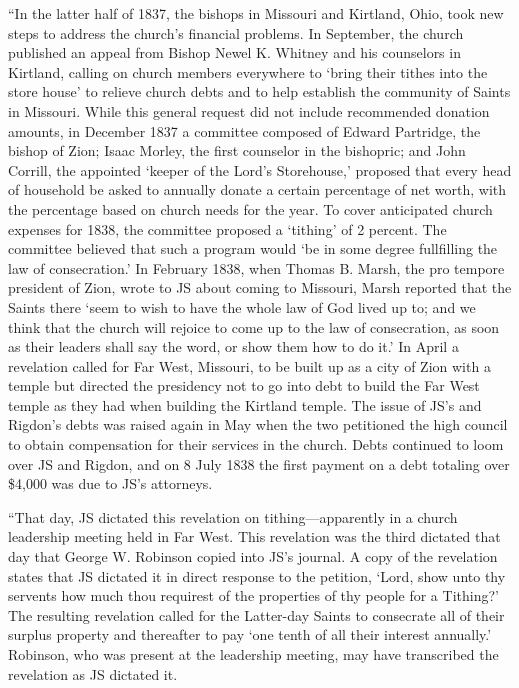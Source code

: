 			``In the latter half of 1837, the bishops in Missouri and Kirtland, Ohio, took new steps to address the church's financial problems. In September, the church published an appeal from Bishop Newel K. Whitney and his counselors in Kirtland, calling on church members everywhere to `bring their tithes into the store house' to relieve church debts and to help establish the community of Saints in Missouri. While this general request did not include recommended donation amounts, in December 1837 a committee composed of Edward Partridge, the bishop of Zion; Isaac Morley, the first counselor in the bishopric; and John Corrill, the appointed `keeper of the Lord's Storehouse,' proposed that every head of household be asked to annually donate a certain percentage of net worth, with the percentage based on church needs for the year. To cover anticipated church expenses for 1838, the committee proposed a `tithing' of 2 percent. The committee believed that such a program would `be in some degree fullfilling the law of consecration.' In February 1838, when Thomas B. Marsh, the pro tempore president of Zion, wrote to JS about coming to Missouri, Marsh reported that the Saints there `seem to wish to have the whole law of God lived up to; and we think that the church will rejoice to come up to the law of consecration, as soon as their leaders shall say the word, or show them how to do it.' In April a revelation called for Far West, Missouri, to be built up as a city of Zion with a temple but directed the presidency not to go into debt to build the Far West temple as they had when building the Kirtland temple. The issue of JS's and Rigdon's debts was raised again in May when the two petitioned the high council to obtain compensation for their services in the church. Debts continued to loom over JS and Rigdon, and on 8 July 1838 the first payment on a debt totaling over \$4,000 was due to JS's attorneys.
			
			``That day, JS dictated this revelation on tithing---apparently in a church leadership meeting held in Far West. This revelation was the third dictated that day that George W. Robinson copied into JS's journal. A copy of the revelation states that JS dictated it in direct response to the petition, `Lord, show unto thy servents how much thou requirest of the properties of thy people for a Tithing?' The resulting revelation called for the Latter-day Saints to consecrate all of their surplus property and thereafter to pay `one tenth of all their interest annually.' Robinson, who was present at the leadership meeting, may have transcribed the revelation as JS dictated it.
			

